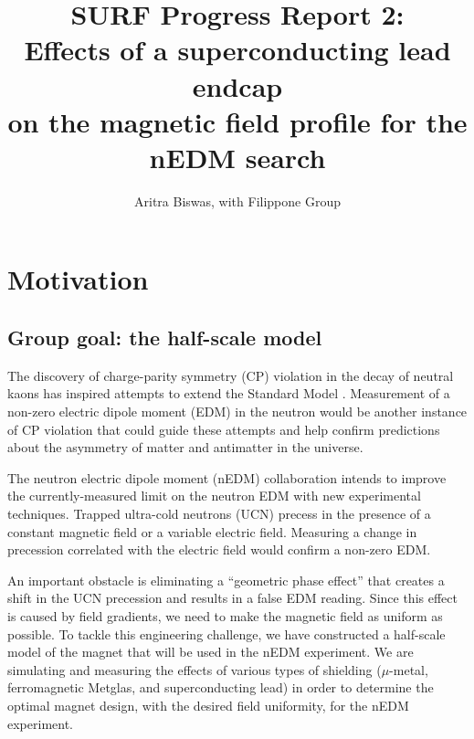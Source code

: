\documentclass[twocolumn,aps,prb,citeautoscript]{revtex4-1}
\begin{document}
\title{SURF Progress Report 2:\\
Effects of a superconducting lead endcap \\ on the magnetic field
profile for the nEDM search}
\author{Aritra Biswas, with Filippone Group}



\maketitle

\section{Motivation}

\subsection{Group goal: the half-scale model}

The discovery of charge-parity symmetry (CP) violation 
in the decay of neutral kaons has inspired attempts to extend the
Standard Model \cite{cpv}. Measurement of a non-zero electric dipole
moment (EDM) in the neutron would be another instance of CP violation that
could guide these attempts and help confirm predictions about the asymmetry of
matter and antimatter in the universe.

The neutron electric dipole moment (nEDM) collaboration intends to
improve \cite{krl} the currently-measured limit \cite{ill}
on the neutron EDM with new experimental techniques.
Trapped ultra-cold neutrons (UCN) precess in the presence
of a constant magnetic field or a variable electric field. Measuring
a change in precession correlated with the electric field
would confirm a non-zero EDM.

An important obstacle is eliminating a ``geometric phase effect''
that creates a shift in the UCN precession and results in
a false EDM reading. Since this effect is caused by field gradients,
we need to make the magnetic field as uniform as possible.
To tackle this engineering challenge,
we have constructed a half-scale model of the magnet that will be
used in the nEDM experiment. We are simulating and measuring
the effects of various types of shielding ($\mu$-metal,
ferromagnetic Metglas, and superconducting lead) in order to
determine the optimal magnet design, with the desired field uniformity,
for the nEDM experiment.
\end{document}

